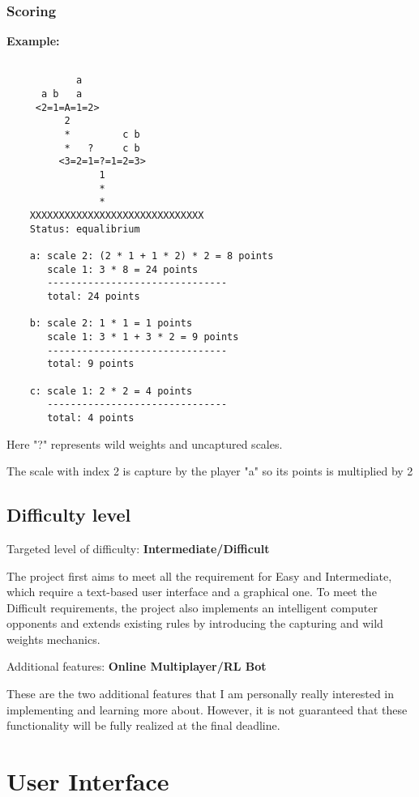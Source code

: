 \documentclass[12pt]{article}
\begin{document}
\subsubsection{Scoring}

\textbf{Example:} 
\begin{verbatim}

            a
      a b   a
     <2=1=A=1=2>
          2          
          *         c b
          *   ?     c b
         <3=2=1=?=1=2=3>
                1
                *
                *
    XXXXXXXXXXXXXXXXXXXXXXXXXXXXXX
    Status: equalibrium 

    a: scale 2: (2 * 1 + 1 * 2) * 2 = 8 points 
       scale 1: 3 * 8 = 24 points
       -------------------------------
       total: 24 points

    b: scale 2: 1 * 1 = 1 points
       scale 1: 3 * 1 + 3 * 2 = 9 points
       -------------------------------
       total: 9 points

    c: scale 1: 2 * 2 = 4 points
       -------------------------------
       total: 4 points
\end{verbatim}

Here "?" represents wild weights and uncaptured scales. 

The scale with index 2 is capture by the player "a" so its points is multiplied
by 2

\subsection{Difficulty level}
Targeted level of difficulty: \textbf{Intermediate/Difficult}

The project first aims to meet all the requirement for Easy and Intermediate,
which require a text-based user interface and a graphical one. To meet the
Difficult requirements, the project also implements an intelligent computer
opponents and extends existing rules by introducing the capturing and wild
weights mechanics. 

Additional features: \textbf{Online Multiplayer/RL Bot}

These are the two additional features that I am personally really interested in
implementing and learning more about. However, it is not guaranteed that these
functionality will be fully realized at the final deadline. 

\section{User Interface}
\end{document}
